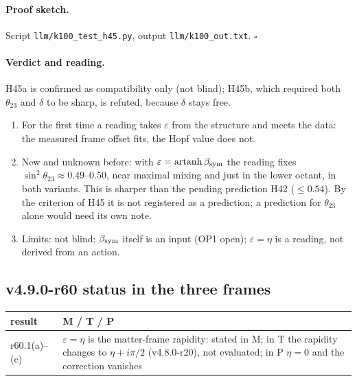 \paragraph{Proof sketch.}
Script \texttt{llm/k100\_test\_h45.py}, output \texttt{llm/k100\_out.txt}.  \(\square\)

\paragraph{Verdict and reading.}
H45a is confirmed as compatibility only (not blind); H45b, which required both \(\theta_{23}\) and \(\delta\) to be sharp, is refuted, because \(\delta\) stays free.
\begin{enumerate}[leftmargin=2em]
\item For the first time a reading takes \(\varepsilon\) from the structure and meets the data: the measured frame offset fits, the Hopf value does not.
\item New and unknown before: with \(\varepsilon=\operatorname{artanh}\beta_{\rm sym}\) the reading fixes \(\sin^2\theta_{23}\approx0.49\)--\(0.50\), near maximal mixing and just in the
lower octant, in both variants.  This is sharper than the pending prediction H42 (\(\le0.54\)).  By the criterion of H45 it is not registered as a prediction; a
prediction for \(\theta_{23}\) alone would need its own note.
\item Limits: not blind; \(\beta_{\rm sym}\) itself is an input (OP1 open); \(\varepsilon=\eta\) is a reading, not derived from an action.
\end{enumerate}

\subsection*{v4.9.0-r60 status in the three frames}
\label{subsec:v490-r60-frames}

\begin{center}
\small
\begin{tabular}{@{}>{\raggedright\arraybackslash}p{}>{\raggedright\arraybackslash}p{}@{}}
\toprule
result & M / T / P\\
\midrule
r60.1(a)--(c) & \(\varepsilon=\eta\) is the matter-frame rapidity: stated in M; in T the rapidity changes to \(\eta+i\pi/2\) (v4.8.0-r20), not evaluated; in P \(\eta=0\) and the correction vanishes\\
\bottomrule
\end{tabular}
\end{center}

